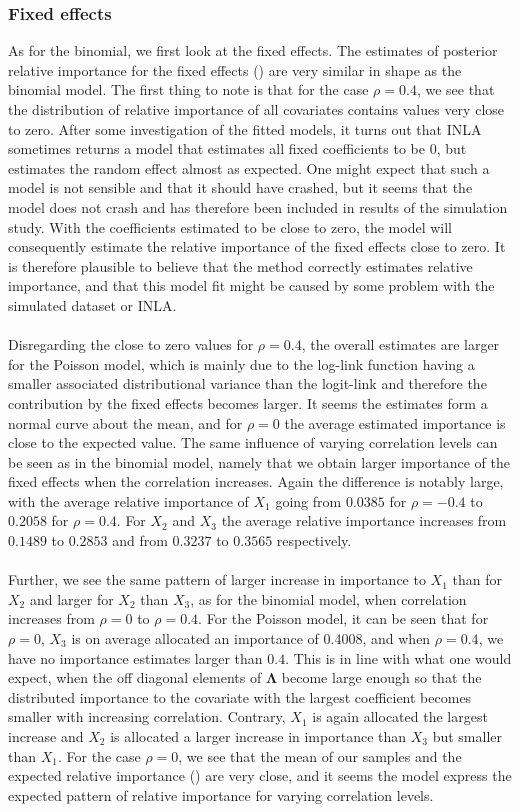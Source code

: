 \subsubsection{Fixed effects}
As for the binomial, we first look at the fixed effects. The estimates of posterior relative importance for the fixed effects () are very similar in shape as the binomial model. The first thing to note is that for the case $\rho=0.4$, we see that the distribution of relative importance of all covariates contains values very close to zero. After some investigation of the fitted models, it turns out that INLA sometimes returns a model that estimates all fixed coefficients to be $0$, but estimates the random effect almost as expected. One might expect that such a model is not sensible and that it should have crashed, but it seems that the model does not crash and has therefore been included in results of the simulation study. With the coefficients estimated to be close to zero, the model will consequently estimate the relative importance of the fixed effects close to zero. It is therefore plausible to believe that the method correctly estimates relative importance, and that this model fit might be caused by some problem with the simulated dataset or INLA.
\\
\\
Disregarding the close to zero values for $\rho=0.4$, the overall estimates are larger for the Poisson model, which is mainly due to the log-link function having a smaller associated distributional variance than the logit-link and therefore the contribution by the fixed effects becomes larger. It seems the estimates form a normal curve about the mean, and for $\rho=0$ the average estimated importance is close to the expected value. The same influence of varying correlation levels can be seen as in the binomial model, namely that we obtain larger importance of the fixed effects when the correlation increases. Again the difference is notably large, with the average relative importance of $X_1$ going from $0.0385$ for $\rho=-0.4$ to $0.2058$ for $\rho=0.4$. For $X_2$ and $X_3$ the average relative importance increases from $0.1489$ to $0.2853$ and from $0.3237$ to $0.3565$ respectively.
\\
\\
Further, we see the same pattern of larger increase in importance to $X_1$ than for $X_2$ and larger for $X_2$ than $X_3$, as for the binomial model, when correlation increases from $\rho=0$ to $\rho=0.4$. For the Poisson model, it can be seen that for $\rho=0$, $X_3$ is on average allocated an importance of $0.4008$, and when $\rho=0.4$, we have no importance estimates larger than $0.4$. This is in line with what one would expect, when the off diagonal elements of $\boldsymbol{\Lambda}$ become large enough so that the distributed importance to the covariate with the largest coefficient becomes smaller with increasing correlation. Contrary, $X_1$ is again allocated the largest increase and $X_2$ is allocated a larger increase in importance than $X_3$ but smaller than $X_1$. For the case $\rho=0$, we see that the mean of our samples and the expected relative importance () are very close, and it seems the model express the expected pattern of relative importance for varying correlation levels.
